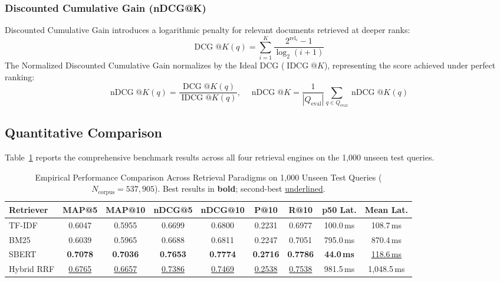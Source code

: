 \documentclass[11pt,a4paper]{article}
\begin{document}
\subsubsection{Discounted Cumulative Gain (nDCG@K)}
Discounted Cumulative Gain introduces a logarithmic penalty for relevant documents retrieved at deeper ranks:
\begin{equation}
\operatorname{DCG}@K(q) = \sum_{i=1}^{K} \frac{2^{\operatorname{rel}_i} - 1}{\log_2(i + 1)}
\end{equation}
The Normalized Discounted Cumulative Gain normalizes by the Ideal DCG ($\operatorname{IDCG}@K$), representing the score achieved under perfect ranking:
\begin{equation}
\operatorname{nDCG}@K(q) = \frac{\operatorname{DCG}@K(q)}{\operatorname{IDCG}@K(q)}, \quad \operatorname{nDCG}@K = \frac{1}{|Q_{\text{eval}}|} \sum_{q \in Q_{\text{eval}}} \operatorname{nDCG}@K(q)
\end{equation}

\subsection{Quantitative Comparison}
Table~\ref{tab:model_comparison} reports the comprehensive benchmark results across all four retrieval engines on the 1,000 unseen test queries.

\begin{table}[h]
\centering
\small
\caption{Empirical Performance Comparison Across Retrieval Paradigms on 1,000 Unseen Test Queries ($N_{\text{corpus}} = 537,905$). Best results in \textbf{bold}; second-best \underline{underlined}.}
\label{tab:model_comparison}
\begin{tabularx}{\textwidth}{lcccccccc}
\toprule
\textbf{Retriever} & \textbf{MAP@5} & \textbf{MAP@10} & \textbf{nDCG@5} & \textbf{nDCG@10} & \textbf{P@10} & \textbf{R@10} & \textbf{p50 Lat.} & \textbf{Mean Lat.} \\
\midrule
TF-IDF & 0.6047 & 0.5955 & 0.6699 & 0.6800 & 0.2231 & 0.6977 & 100.0\,ms & 108.7\,ms \\
BM25 & 0.6039 & 0.5965 & 0.6688 & 0.6811 & 0.2247 & 0.7051 & 795.0\,ms & 870.4\,ms \\
SBERT & \textbf{0.7078} & \textbf{0.7036} & \textbf{0.7653} & \textbf{0.7774} & \textbf{0.2716} & \textbf{0.7786} & \textbf{44.0\,ms} & \underline{118.6\,ms} \\
Hybrid RRF & \underline{0.6765} & \underline{0.6657} & \underline{0.7386} & \underline{0.7469} & \underline{0.2538} & \underline{0.7538} & 981.5\,ms & 1,048.5\,ms \\
\bottomrule
\end{tabularx}
\end{table}
\end{document}
